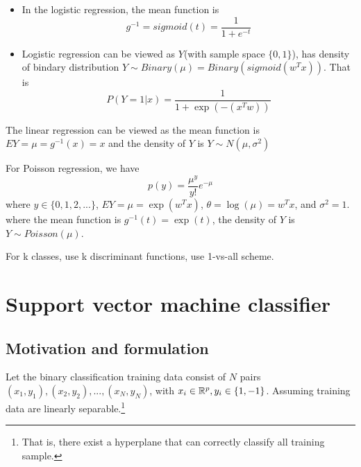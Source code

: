 \begin{refsection}
\begin{remark}\hfill
	\begin{itemize}
		\item In the logistic regression, the mean function is $$g^{-1} = sigmoid(t) = \frac{1}{1+e^{-t}}$$
		\item Logistic regression can be viewed as $Y$(with sample space $\{0,1\}$), has density of bindary distribution $Y\sim Binary(\mu) = Binary(sigmoid(w^Tx))$. That is
		$$P(Y=1 |x ) =  \frac{1}{1 + \exp(-(x^Tw))}$$ 
	\end{itemize}
\end{remark}

\begin{remark}
	The linear regression can be viewed as the mean function is $EY = \mu = g^{-1}(x) = x$ and the density of $Y$ is $Y\sim N(\mu,\sigma^2)$
\end{remark}

\begin{remark}
	For Poisson regression, we have
	$$p(y) = \frac{\mu^y}{y!}e^{-\mu}$$
	where $y \in \{0, 1, 2, ... \}$, $EY = \mu = \exp(w^Tx)$, $θ = \log(\mu) = w^Tx$, and $\sigma^2 = 1$.
	where the mean function is $g^{-1}(t) = \exp(t)$, the density of $Y$ is $Y\sim Poisson(\mu)$.	
\end{remark}


\begin{remark}
	For k classes, use k discriminant functions, use 1-vs-all scheme.	
\end{remark}



\section{Support vector machine classifier}


\subsection{Motivation and formulation}


\begin{definition}Let the binary classification training data consist of $N$ pairs $(x_1,y_1),(x_2,y_2),...,(x_N,y_N)$, with $x_i \in \mathbb{R}^p, y_i \in \{1,-1\}$. Assuming training data are linearly separable.\footnote{That is, there exist a hyperplane that can correctly classify all training sample.} 


\end{definition}
\end{refsection}

